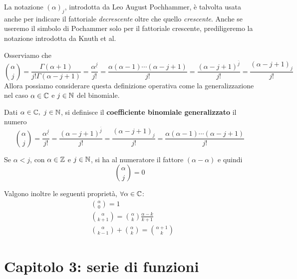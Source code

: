 \begin{attention}
		La notazione $\left(\alpha\right)_j$, introdotta da Leo August Pochhammer, è talvolta usata anche per indicare il fattoriale \textit{decrescente} oltre che quello \textit{crescente}. Anche se useremo il simbolo di Pochammer solo per il fattoriale crescente, prediligeremo la notazione introdotta da Knuth et al. %
\end{attention}
Osserviamo che
\begin{equation*}
	\binom{\alpha}{j}=\frac{\Gamma\left(\alpha+1\right)}{j!\Gamma\left(\alpha-j+1\right)}=\frac{\alpha^{\underline{j}}}{j!}=\frac{\alpha\left(\alpha-1\right)\cdots\left(\alpha-j+1\right)}{j!}=\frac{\left(\alpha-j+1\right)^{\overline{j}}}{j!}=\frac{\left(\alpha-j+1\right)_j}{j!}
\end{equation*}
Allora possiamo considerare questa definizione operativa come la generalizzazione nel caso $\alpha\in\mathbb{C}$ e $j\in\mathbb{N}$ del binomiale.
\begin{define}
	Dati $\alpha\in\complexset,\ j\in\naturalset$, si definisce il \textbf{coefficiente binomiale generalizzato} il numero
	\begin{equation}
		\binom{\alpha}{j}=\frac{\alpha^{\underline{j}}}{j!}=\frac{\left(\alpha-j+1\right)^{\overline{j}}}{j!}=\frac{\left(\alpha-j+1\right)_j}{j!}=\frac{\alpha\left(\alpha-1\right)\cdots\left(\alpha-j+1\right)}{j!}
	\end{equation}
\end{define}
\begin{observe}
	Se $\alpha<j$, con $\alpha\in\mathbb{Z}$ e $j\in\mathbb{N}$, si ha al numeratore il fattore $\left(\alpha-\alpha\right)$ e quindi
	\begin{equation*}
		\binom{\alpha}{j}=0
	\end{equation*}
\end{observe}
Valgono inoltre le seguenti proprietà, $\forall \alpha\in\mathbb{C}$:
\begin{align}
	&\binom{\alpha}{0}=1\\
	&\binom{\alpha}{k+1}=\binom{\alpha}{k}\frac{\alpha-k}{k+1}\\
	&\binom{\alpha}{k-1}+\binom{\alpha}{k}=\binom{\alpha+1}{k}
\end{align}
\section{Capitolo 3: serie di funzioni}
